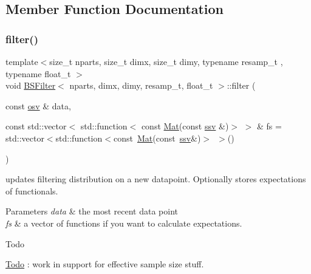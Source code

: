 \subsection{Member Function Documentation}
\mbox{\label{classBSFilter_a651d0228e8477c0ca7d522cd72908a57}} 
\subsubsection{\texorpdfstring{filter()}{filter()}}
{\footnotesize\ttfamily template$<$size\+\_\+t nparts, size\+\_\+t dimx, size\+\_\+t dimy, typename resamp\+\_\+t , typename float\+\_\+t $>$ \\
void \hyperlink{classBSFilter}{B\+S\+Filter}$<$ nparts, dimx, dimy, resamp\+\_\+t, float\+\_\+t $>$\+::filter (\begin{DoxyParamCaption}\item[{const \hyperlink{classBSFilter_ad8512328484d7c7bd7a3b7a9481d7f37}{osv} \&}]{data,  }\item[{const std\+::vector$<$ std\+::function$<$ const \hyperlink{classBSFilter_a8ec8e8477e12686e706e7d7aa5c2971c}{Mat}(const \hyperlink{classBSFilter_a0b5bc93957fb6b6b1282f31fa2e01c3c}{ssv} \&)$>$ $>$ \&}]{fs = {\ttfamily std\+:\+:vector$<$std\+:\+:function$<$const~\hyperlink{classBSFilter_a8ec8e8477e12686e706e7d7aa5c2971c}{Mat}(const~\hyperlink{classBSFilter_a0b5bc93957fb6b6b1282f31fa2e01c3c}{ssv}\&)$>$~$>$()} }\end{DoxyParamCaption})}



updates filtering distribution on a new datapoint. Optionally stores expectations of functionals. 


\begin{DoxyParams}{Parameters}
{\em data} & the most recent data point \\
\hline
{\em fs} & a vector of functions if you want to calculate expectations. \\
\hline
\end{DoxyParams}
\begin{DoxyRefDesc}{Todo}
\item[\hyperlink{todo__todo000001}{Todo}]\+: work in support for effective sample size stuff. \end{DoxyRefDesc}
\mbox{\label{classBSFilter_a72ec2cf2887b3d236f5bc54cc5c5df95}} 
